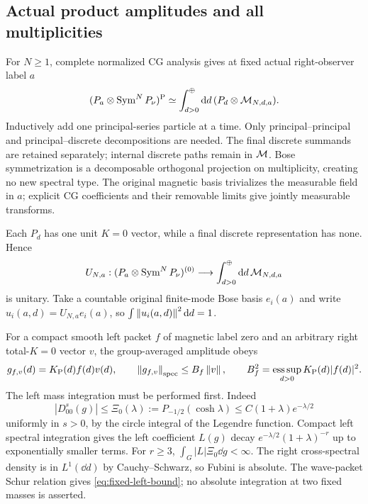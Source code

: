 \subsection{Actual product amplitudes and all multiplicities}
For $N\ge1$, complete normalized CG analysis gives at fixed actual
right-observer label $a$
\begin{equation}
 (P_a\otimes\operatorname{Sym}^NP_\nu)^{\mathrm P}
 \simeq\int_{d>0}^{\oplus}\mathop{}\!\mathrm d d\,(P_d\otimes\mathcal M_{N,d,a}).
 \label{eq:cg-multiplicity}
\end{equation}
Inductively add one principal-series particle at a time. Only
principal--principal and principal--discrete decompositions are needed.
The final discrete summands are retained separately; internal discrete
paths remain in $\mathcal M$. Bose symmetrization is a decomposable orthogonal
projection on multiplicity, creating no new spectral type. The original
magnetic basis trivializes the measurable field in $a$; explicit CG
coefficients and their removable limits give jointly measurable transforms.

Each $P_d$ has one unit $K=0$ vector, while a final discrete representation
has none. Hence
\begin{equation}
 U_{N,a}:(P_a\otimes\operatorname{Sym}^NP_\nu)^{(0)}
 \longrightarrow\int_{d>0}^{\oplus}\mathop{}\!\mathrm d d\,\mathcal M_{N,d,a}
\end{equation}
is unitary. Take a countable original finite-mode Bose basis $e_i(a)$ and
write $u_i(a,d)=U_{N,a}e_i(a)$, so $\int\left\lVert u_i(a,d)\right\rVert^2\mathop{}\!\mathrm d d=1$.

For a compact smooth left packet $f$ of magnetic label zero and an
arbitrary right total-$K=0$ vector $v$, the group-averaged amplitude obeys
\begin{equation}
 g_{f,v}(d)=K_{\mathrm P}(d)f(d)v(d),\qquad
 \left\lVert g_{f,v}\right\rVert_{\mathrm{spec}}\le B_f\left\lVert v\right\rVert,\qquad
 B_f^2=\operatorname*{ess\,sup}_{d>0}K_{\mathrm P}(d)|f(d)|^2.
 \label{eq:fixed-left-bound}
\end{equation}
The left mass integration must be performed first. Indeed
\begin{equation}
 |D^s_{00}(g)|\le\Xi_0(\lambda):=P_{-1/2}(\cosh\lambda)
 \le C(1+\lambda)e^{-\lambda/2}
\end{equation}
uniformly in $s>0$, by the circle integral of the Legendre function.
Compact left spectral integration gives the left coefficient $L(g)$
decay $e^{-\lambda/2}(1+\lambda)^{-r}$ up to exponentially smaller terms.
For $r\ge3$, $\int_G|L|\Xi_0\dd g<\infty$. The right cross-spectral
density is in $L^1(\dd d)$ by Cauchy--Schwarz, so Fubini is absolute.
The wave-packet Schur relation gives \eqref{eq:fixed-left-bound};
no absolute integration at two fixed masses is asserted.

